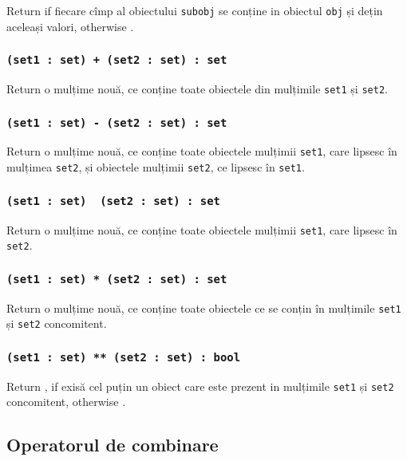 Return \false{} if fiecare cîmp al obiectului \texttt{subobj} se conține in obiectul \texttt{obj} și dețin aceleași valori, otherwise \true{}.

\subsubsection{\texttt{(set1 : set) + (set2 : set) : set}}

Return o mulțime nouă, ce conține toate obiectele din mulțimile \texttt{set1} și \texttt{set2}.

\subsubsection{\texttt{(set1 : set) - (set2 : set) : set}}

Return o mulțime nouă, ce conține toate obiectele mulțimii \texttt{set1}, care lipsesc în mulțimea \texttt{set2}, și obiectele mulțimii \texttt{set2}, ce lipsesc în \texttt{set1}.

\subsubsection{\texttt{(set1 : set) \ (set2 : set) : set}}

Return o mulțime nouă, ce conține toate obiectele mulțimii \texttt{set1}, care lipsesc în \texttt{set2}.

\subsubsection{\texttt{(set1 : set) * (set2 : set) : set}}

Return o mulțime nouă, ce conține toate obiectele ce se conțin în mulțimile \texttt{set1} și \texttt{set2} concomitent.

\subsubsection{\texttt{(set1 : set) ** (set2 : set) : bool}}

Return \true, if exisă cel puțin un obiect care este prezent in mulțimile \texttt{set1} și \texttt{set2} concomitent, otherwise \false.

\subsection{Operatorul de combinare}

